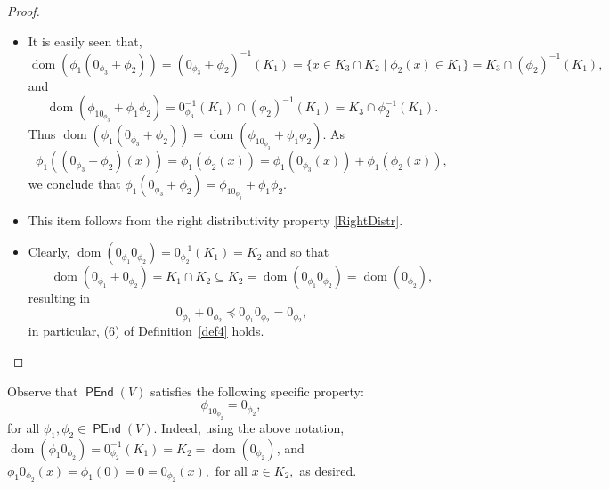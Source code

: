 \documentclass[10pt,a4paper]{amsart}
\theoremstyle{definition}
\theoremstyle{remark}
\numberwithin{equation}{section}
\newtheorem*{Theorem A}{\textbf{Theorem A}}
\newtheorem*{Corollary E}{\textbf{Corollary E}}
\newtheorem*{Corollary F}{\textbf{Corollary F}}
\newtheorem*{Theorem B}{\textbf{Theorem B}}
\newtheorem*{Theorem C}{\textbf{Theorem C}}
\newtheorem*{Theorem D}{\textbf{Theorem B}}
\newtheorem*{p a}{\textbf{Proof of  Theorem A}}
\newtheorem*{p b}{\textbf{Proof of Theorem B}}
\newtheorem*{p c}{\textbf{Proof of  Theorem C}}
\newtheorem*{p d}{\textbf{Proof of  Theorem D}}
\newcommand{\0}{{\vartheta}}
\DeclareMathOperator{\dom}{dom}
\DeclareMathOperator{\pen}{\textsf{PEnd}}
\begin{document}
\begin{proof}
\begin{itemize}
\item[$(4)$] %
 It is easily seen that, $$\dom (\phi_1(0_{\phi_3} +\phi_2))=(0_{\phi_3} +\phi_2)^{-1}(K_1)=\{x\in K_3\cap K_2\mid \phi_2(x)\in K_1\}=K_3\cap (\phi_2)^{-1}(K_1),$$
and $$\dom (\phi_10_{\phi_3} +\phi_1\phi_2)= 0_{\phi_3}^{-1}(K_1)\cap(\phi_2)^{-1}(K_1) =K_3\cap \phi_2^{-1}(K_1).$$ 
Thus $\dom (\phi_1(0_{\phi_3} +\phi_2))=\dom (\phi_10_{\phi_3} +\phi_1\phi_2)$. As 
        $$\phi_1 ((0_{\phi_3}+\phi_2)(x))= \phi_1  (\phi_2 (x)) =  \phi_1 (0_{\phi_3} (x))+ \phi_1(\phi_2(x)),$$ we conclude that $\phi_1 (0_{\phi_3}+\phi_2)=\phi_10_{\phi_3} +\phi_1\phi_2.$
        
\item[$(5)$] This item follows from the right distributivity property \eqref{RightDistr}.
\item[$(6)$] Clearly,   $\dom (0_{\phi_1}  0_{\phi _2})=  0_{\phi_2}^{-1}(K_1) = K_2$ and  
so that  $$  \dom (0_{\phi_1} +0_{\phi _2})  = K_1 \cap K_2 \subseteq  K_2= \dom ( 0_{\phi_1}  0_{\phi _2})=  \dom (0_{\phi _2}),$$  resulting in 
$$ 0_{\phi_1} +0_{\phi _2}  \preceq    0_{\phi_1}  0_{\phi _2}=  0_{\phi _2},  $$ 
in particular,  (6) of Definition~\ref{def4} holds.

\end{itemize}  
\end{proof}

 Observe that $\pen(V)$  satisfies the following specific property:
$$\phi_10_{\phi_2}=0_{\phi_2},$$ for all  $ \phi_1, \phi_2 \in \pen(V).$
 Indeed,  using the above notation,  
 $\dom (\phi_1 0_{\phi_2}) =0_{\phi_2}^{-1}(K_1)=K_2=\dom (0_{\phi_2})$, and 
$ \phi_1 0_{\phi_2}(x)= \phi_1 (0)= 0=0_{\phi_2}(x),  $ for all $x\in K_2,$ 
 as desired.
\end{document}
